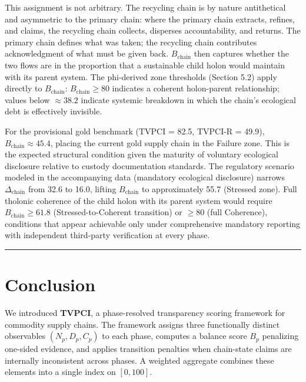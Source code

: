 \documentclass[12pt]{article}
\begin{document}
This assignment is not arbitrary. The recycling chain is by nature
antithetical and asymmetric to the primary chain: where the primary
chain extracts, refines, and claims, the recycling chain collects,
disperses accountability, and returns. The primary chain defines what
was taken; the recycling chain contributes acknowledgment of what must
be given back. \(B_{\text{chain}}\) then captures whether the two flows
are in the proportion that a sustainable child holon would maintain with
its parent system. The phi-derived zone thresholds (Section 5.2) apply
directly to \(B_{\text{chain}}\): \(B_{\text{chain}} \geq 80\) indicates
a coherent holon-parent relationship; values below \(\approx 38.2\)
indicate systemic breakdown in which the chain's ecological debt is
effectively invisible.

For the provisional gold benchmark (TVPCI = 82.5, TVPCI-R = 49.9),
\(B_{\text{chain}} \approx 45.4\), placing the current gold supply chain
in the Failure zone. This is the expected structural condition given the
maturity of voluntary ecological disclosure relative to custody
documentation standards. The regulatory scenario modeled in the
accompanying data (mandatory ecological disclosure) narrows
\(\Delta_{\text{chain}}\) from 32.6 to 16.0, lifting
\(B_{\text{chain}}\) to approximately 55.7 (Stressed zone). Full
tholonic coherence of the child holon with its parent system would
require \(B_{\text{chain}} \geq 61.8\) (Stressed-to-Coherent transition)
or \(\geq 80\) (full Coherence), conditions that appear achievable only
under comprehensive mandatory reporting with independent third-party
verification at every phase.

\begin{center}\rule{0.5\linewidth}{0.5pt}\end{center}

\section{Conclusion}\label{conclusion}

We introduced \textbf{TVPCI}, a phase-resolved transparency scoring
framework for commodity supply chains. The framework assigns three
functionally distinct observables \((N_p, D_p, C_p)\) to each phase,
computes a balance score \(B_p\) penalizing one-sided evidence, and
applies transition penalties when chain-state claims are internally
inconsistent across phases. A weighted aggregate combines these elements
into a single index on \([0,100]\).
\end{document}
